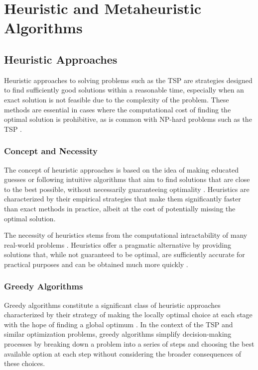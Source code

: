 
%

\chapter{Heuristic and Metaheuristic Algorithms}\label{chapt:4}
\section{Heuristic Approaches}

Heuristic approaches to solving problems such as the \Gls{TSP} are strategies designed to find sufficiently good solutions within a reasonable time, especially when an exact solution is not feasible due to the complexity \cite{Johnson2002} of the problem. These methods are essential in cases where the computational cost of finding the optimal solution is prohibitive, as is common with NP-hard problems such as the \Gls{TSP} \cite{Cormen2009}.

\subsection{Concept and Necessity}
The concept of heuristic approaches is based on the idea of making educated guesses or following intuitive algorithms that aim to find solutions that are close to the best possible, without necessarily guaranteeing optimality \cite{Papadimitriou1998}. Heuristics are characterized by their empirical strategies that make them significantly faster than exact methods in practice, albeit at the cost of potentially missing the optimal solution.

The necessity of heuristics stems from the computational intractability of many real-world problems \cite{Lawler1985}. Heuristics offer a pragmatic alternative by providing solutions that, while not guaranteed to be optimal, are sufficiently accurate for practical purposes and can be obtained much more quickly \cite{Aarts1989}.

\subsection{Greedy Algorithms}

Greedy algorithms constitute a significant class of heuristic approaches characterized by their strategy of making the locally optimal choice at each stage with the hope of finding a global optimum \cite{Cormen2009}. In the context of the \Gls{TSP} and similar optimization problems, greedy algorithms simplify decision-making processes by breaking down a problem into a series of steps and choosing the best available option at each step without considering the broader consequences of these choices\cite{Johnson2002}.

